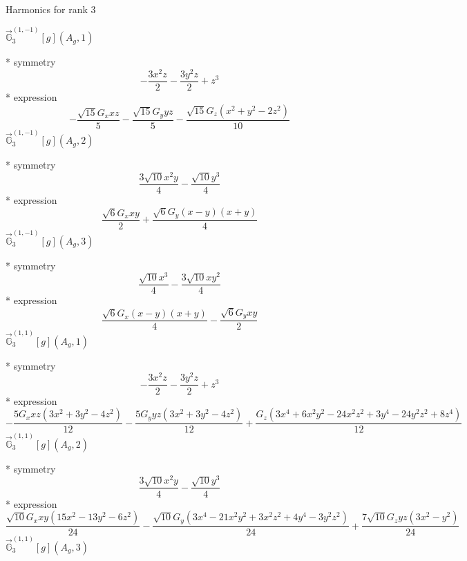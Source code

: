 \documentclass[fleqn,8pt]{jsarticle}
\begin{document}
\noindent * Harmonics for rank 3

\noindent\quad $\vec{\mathbb{G}}_{3}^{(1,-1)}[g](A_{g},1)$

\noindent\quad ** symmetry
\begin{dmath*}
- \frac{3 x^{2} z}{2} - \frac{3 y^{2} z}{2} + z^{3}
\end{dmath*}
\noindent\quad ** expression
\begin{dmath*}
- \frac{\sqrt{15} G_{x} x z}{5} - \frac{\sqrt{15} G_{y} y z}{5} - \frac{\sqrt{15} G_{z} \left(x^{2} + y^{2} - 2 z^{2}\right)}{10}
\end{dmath*}
\noindent\quad $\vec{\mathbb{G}}_{3}^{(1,-1)}[g](A_{g},2)$

\noindent\quad ** symmetry
\begin{dmath*}
\frac{3 \sqrt{10} x^{2} y}{4} - \frac{\sqrt{10} y^{3}}{4}
\end{dmath*}
\noindent\quad ** expression
\begin{dmath*}
\frac{\sqrt{6} G_{x} x y}{2} + \frac{\sqrt{6} G_{y} \left(x - y\right) \left(x + y\right)}{4}
\end{dmath*}
\noindent\quad $\vec{\mathbb{G}}_{3}^{(1,-1)}[g](A_{g},3)$

\noindent\quad ** symmetry
\begin{dmath*}
\frac{\sqrt{10} x^{3}}{4} - \frac{3 \sqrt{10} x y^{2}}{4}
\end{dmath*}
\noindent\quad ** expression
\begin{dmath*}
\frac{\sqrt{6} G_{x} \left(x - y\right) \left(x + y\right)}{4} - \frac{\sqrt{6} G_{y} x y}{2}
\end{dmath*}
\noindent\quad $\vec{\mathbb{G}}_{3}^{(1,1)}[g](A_{g},1)$

\noindent\quad ** symmetry
\begin{dmath*}
- \frac{3 x^{2} z}{2} - \frac{3 y^{2} z}{2} + z^{3}
\end{dmath*}
\noindent\quad ** expression
\begin{dmath*}
- \frac{5 G_{x} x z \left(3 x^{2} + 3 y^{2} - 4 z^{2}\right)}{12} - \frac{5 G_{y} y z \left(3 x^{2} + 3 y^{2} - 4 z^{2}\right)}{12} + \frac{G_{z} \left(3 x^{4} + 6 x^{2} y^{2} - 24 x^{2} z^{2} + 3 y^{4} - 24 y^{2} z^{2} + 8 z^{4}\right)}{12}
\end{dmath*}
\noindent\quad $\vec{\mathbb{G}}_{3}^{(1,1)}[g](A_{g},2)$

\noindent\quad ** symmetry
\begin{dmath*}
\frac{3 \sqrt{10} x^{2} y}{4} - \frac{\sqrt{10} y^{3}}{4}
\end{dmath*}
\noindent\quad ** expression
\begin{dmath*}
\frac{\sqrt{10} G_{x} x y \left(15 x^{2} - 13 y^{2} - 6 z^{2}\right)}{24} - \frac{\sqrt{10} G_{y} \left(3 x^{4} - 21 x^{2} y^{2} + 3 x^{2} z^{2} + 4 y^{4} - 3 y^{2} z^{2}\right)}{24} + \frac{7 \sqrt{10} G_{z} y z \left(3 x^{2} - y^{2}\right)}{24}
\end{dmath*}
\noindent\quad $\vec{\mathbb{G}}_{3}^{(1,1)}[g](A_{g},3)$
\end{document}
